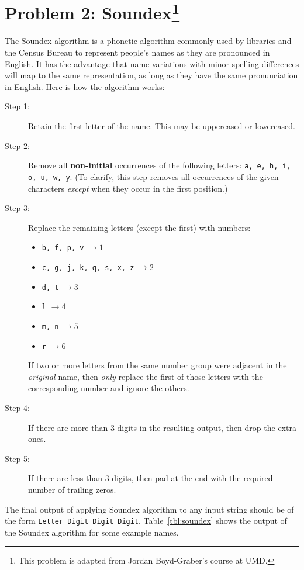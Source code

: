 \documentclass[11pt,letterpaper]{article}
\begin{document}
\section*{Problem 2: Soundex\footnote{ 
This problem is adapted from Jordan Boyd-Graber's course at UMD.} } %
\label{sec:problem_2}
The Soundex algorithm is a phonetic algorithm
commonly used by libraries and the Census Bureau to represent people's
names as they are pronounced in English. It has the advantage that
name variations with minor spelling differences will map to the same
representation, as long as they have the same pronunciation in
English. Here is how the algorithm works:
\begin{description}
	\item[Step 1:] Retain the first letter of the name. This may
          be uppercased or lowercased.
	\item[Step 2:] Remove all \textbf{non-initial} occurrences of
          the following letters: \texttt{a, e, h, i, o, u, w, y}. (To
          clarify, this step removes all occurrences of the given
          characters \emph{except} when they occur in the first
          position.)
	\item[Step 3:] Replace the remaining letters (except the
          first) with numbers:
	\begin{itemize}
		\item \texttt{b, f, p, v} $\rightarrow 1$
		\item \texttt{c, g, j, k, q, s, x, z} $\rightarrow 2$
		\item \texttt{d, t} $\rightarrow 3$
		\item \texttt{l} $\rightarrow 4$
		\item \texttt{m, n} $\rightarrow 5$
		\item \texttt{r} $\rightarrow 6$
	\end{itemize}
 	If two or more letters from the same number group were
        adjacent in the \emph{original} name, then \emph{only} replace
        the first of those letters with the corresponding number and
        ignore the others.
 	\item[Step 4:] If there are more than $3$ digits in the
          resulting output, then drop the extra ones.
 	\item[Step 5:] If there are less than $3$ digits, then pad at
          the end with the required number of trailing zeros.
\end{description}


 The final output of applying Soundex algorithm to any input string
 should be of the form \texttt{Letter Digit Digit
   Digit}. Table~\ref{tbl:soundex} shows the output of the Soundex
 algorithm for some example names. 
\end{document}
